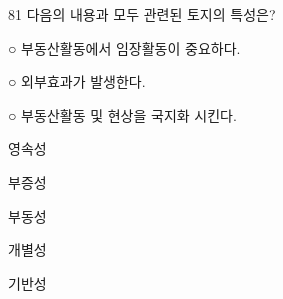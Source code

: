 \begin{question}{81}
다음의 내용과 모두 관련된 토지의 특성은?
\begin{framedtext}
○ 부동산활동에서 임장활동이 중요하다. \par
○ 외부효과가 발생한다. \par
○ 부동산활동 및 현상을 국지화 시킨다. \par
\end{framedtext}
\begin{choices}
  \item 영속성
  \item 부증성
  \item 부동성
  \item 개별성
  \item 기반성
\end{choices}
\end{question}

